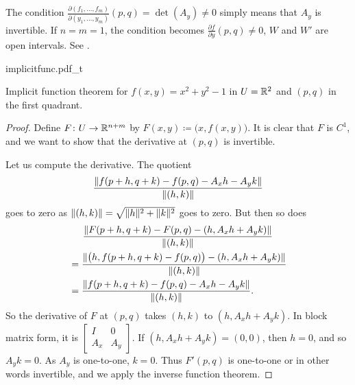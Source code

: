 The condition
$\frac{\partial(f_1,\ldots,f_m)}{\partial(y_1,\ldots,y_m)} (p,q) =
\det(A_y)  \neq 0$
simply means that $A_y$ is invertible.  If $n=m=1$, the condition 
becomes $\frac{\partial f}{\partial y}(p,q) \not= 0$, $W$ and $W'$ are 
open intervals.  See .
\begin{myfigureht}
{implicitfunc.pdf_t}
\caption{Implicit function theorem for $f(x,y) = x^2+y^2-1$ in $U={\mathbb{R}}^2$ and
$(p,q)$ in the first quadrant.\label{fig:implicitfunc}}
\end{myfigureht}

\begin{proof}
Define $F \colon U \to {\mathbb{R}}^{n+m}$ by $F(x,y) \coloneqq \bigl(x,f(x,y)\bigr)$.
It is clear that $F$ is $C^1$, and we want to show that the derivative
at $(p,q)$ is invertible.

Let us compute the derivative.  The quotient
\begin{equation*}
\frac{\lVert {f(p+h,q+k) - f(p,q) - A_x h - A_y k} \rVert}{\lVert {(h,k)} \rVert}
\end{equation*}
goes to zero as $\lVert {(h,k)} \rVert = \sqrt{\lVert {h} \rVert^2+\lVert {k} \rVert^2}$ goes to zero.
But then so does
\begin{multline*}
\frac{\lVert {F(p+h,q+k)-F(p,q) - (h,A_x h+A_y k)} \rVert}{\lVert {(h,k)} \rVert}
\\
\begin{aligned}
& =
\frac{\lVert {\bigl(h,f(p+h,q+k)-f(p,q)\bigr) - (h,A_x h+A_y
k)} \rVert}{\lVert {(h,k)} \rVert}
\\
& =
\frac{\lVert {f(p+h,q+k) - f(p,q) - A_x h - A_y k} \rVert}{\lVert {(h,k)} \rVert} .
\end{aligned}
\end{multline*}
So the derivative of $F$ at $(p,q)$ takes $(h,k)$ to $(h,A_x h+A_y k)$.
In block matrix form, it is
$\left[\begin{smallmatrix}I & 0\\A_x & A_y\end{smallmatrix}\right]$.  If 
$(h,A_x h+A_y k) = (0,0)$, then $h=0$, and so $A_y k = 0$.  As $A_y$ is
one-to-one, $k=0$.  Thus $F'(p,q)$ is one-to-one or in other
words invertible, and we apply the inverse function theorem.


\end{proof}
